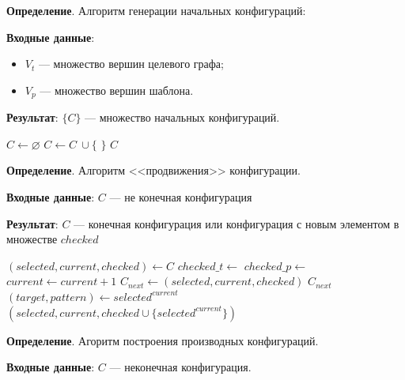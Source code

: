 \textbf{Определение}. Алгоритм генерации начальных конфигураций:

\textbf{Входные данные}:
\begin{itemize}
\item $V_{t}$ --- множество вершин целевого графа;
\item $V_{p}$ --- множество вершин шаблона.
\end{itemize}

\textbf{Результат}: $\{ C \}$ --- множество начальных конфигураций.

\begin{algorithmic}
    \State $C \gets \varnothing$
            \State $C \gets C \ \cup \{$  $\}$
        \EndFor
    \EndFor
    \State \Return $C$
\EndFunction
\end{algorithmic}

\textbf{Определение}. Алгоритм <<продвижения>> конфигурации.

\textbf{Входные данные}: $C$ --- не конечная конфигурация

\textbf{Результат}: $C$ --- конечная конфигурация или конфигурация с новым
элементом в множестве $checked$

\begin{algorithmic}
    \State $(selected, current, checked) \gets C$
    \State $checked\_t \gets$ 
    \State $checked\_p \gets$ 
        \State $current \gets current + 1$
        \State $C_{next} \gets (selected, current, checked)$
            \State \Return $C_{next}$
        \EndIf
        \State $(target, pattern) \gets selected^{current}$
            \State \Return $(selected, current, checked \cup \{ selected^{current} \})$
        \EndIf
    \EndWhile
\EndFunction
\end{algorithmic}

\textbf{Определение}. Агоритм построения производных конфигураций.

\textbf{Входные данные}: $C$ --- неконечная конфигурация.

